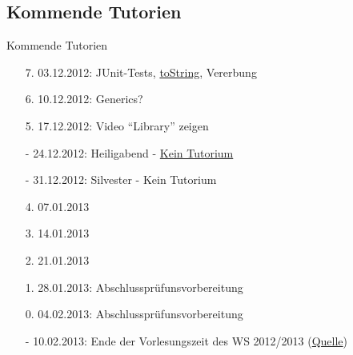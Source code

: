 \documentclass[usepdftitle=false,hyperref={pdfpagelabels=false}]{beamer}
\begin{document}
\subsection{Kommende Tutorien}
\begin{frame}{Kommende Tutorien}
  \begin{itemize}
    \item[7.] 03.12.2012: JUnit-Tests, \href{http://docs.oracle.com/javase/7/docs/api/java/lang/Object.html\#toString()}{toString}, Vererbung
    \item[6.] 10.12.2012: Generics?
    \item[5.] 17.12.2012: Video "`Library"' zeigen
    \item[-] 24.12.2012: Heiligabend - \href{http://www.fmc.uni-karlsruhe.de/faq/wann-sind-die-weihnachtsferien}{Kein Tutorium}
    \item[-] 31.12.2012: Silvester - Kein Tutorium
    \item[4.] 07.01.2013
    \item[3.] 14.01.2013
    \item[2.] 21.01.2013
    \item[1.] 28.01.2013: Abschlussprüfunsvorbereitung
    \item[0.] 04.02.2013: Abschlussprüfunsvorbereitung
    \item[-] 10.02.2013: Ende der Vorlesungszeit des WS 2012/2013 (\href{http://www.kit.edu/studieren/2873.php}{Quelle})
  \end{itemize}
\end{frame}

\end{document}
